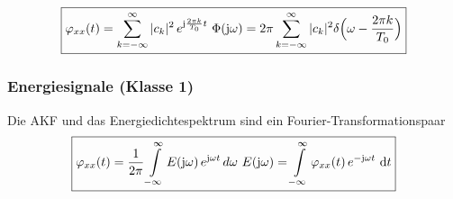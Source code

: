 $$ \boxed{ \varphi_{xx}(t) = \sum\limits_{k = - \infty}^{\infty} |c_k|^2  \, e^{\mathrm{j} \frac{2 \pi k}{T_0} t } \, \relax \, \Phi(\mathrm{j} \omega) 
	= 2 \pi \sum\limits_{k = - \infty}^{\infty}  |c_k|^2 \delta \Big( \omega - \frac{2 \pi k}{T_0} \Big) } $$


\subsubsection{Energiesignale (Klasse 1) }
Die AKF und das Energiedichtespektrum sind ein Fourier-Transformationspaar
$$ \boxed{ \varphi_{xx}(t) = \frac{1}{2 \pi} \int\limits_{- \infty}^{\infty} E(\mathrm{j} \omega) \, e^{\mathrm{j} \omega t} \, d\omega \, \relax \, E(\mathrm{j} \omega)
	= \int\limits_{- \infty}^{\infty} \varphi_{xx}(t) \, e^{-\mathrm{j} \omega t} \, \mathop{} \! \mathrm{d} t } $$